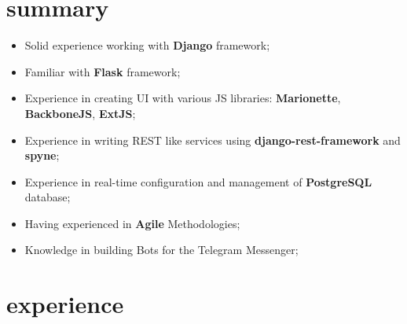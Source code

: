 \documentclass[]{cv-style}
\begin{document}
\section{summary}

\begin{itemize}
    \item Solid experience working with \textbf{Django} framework;
    \item Familiar with \textbf{Flask} framework;
    \item Experience in creating UI with various JS libraries: \textbf{Marionette}, \textbf{BackboneJS}, \textbf{ExtJS};
    \item Experience in writing REST like services using \textbf{django-rest-framework} and \textbf{spyne};
    \item Experience in real-time configuration and management of \textbf{PostgreSQL} database;
    \item Having experienced in \textbf{Agile} Methodologies;
    \item Knowledge in building Bots for the Telegram Messenger;
\end{itemize}

\section{experience}
\end{document}
